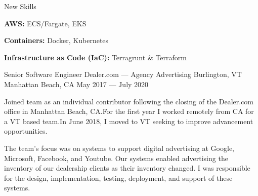 \vspace{-2.00mm}
\begin{cventries}
\cventry
    {New Skills} %
    {} %
    {} %
    {} %
    {    
      \begin{cvitems} %
        \item {\textbf{AWS:} ECS/Fargate, EKS}
        \item {\textbf{Containers:} Docker, Kubernetes}
        \item {\textbf{Infrastructure as Code (IaC):} Terragrunt \& Terraform}
      \end{cvitems}
    }

  \cventry
    {Senior Software Engineer} %
    {Dealer.com --- Agency Advertising} %
    {Burlington, VT \linebreak Manhattan Beach, CA} %
    {May 2017 --- July 2020} %
    {}
\end{cventries}

\vspace{-4.00mm}
\begin{cvparagraph}
Joined team as an individual contributor following the closing of the
Dealer.com office in Manhattan Beach, CA.\@ For the first year I worked
remotely from CA for a VT based team.\@ In June 2018, I moved to VT
seeking to improve advancement opportunities.
\end{cvparagraph}

\vspace{-1.00mm}

\begin{cvparagraph}
The team's focus was on systems to support digital advertising at Google, Microsoft, Facebook, and Youtube.\@
Our systems enabled advertising the inventory of our dealership clients as their inventory changed.\@
I was responsible for the design, implementation, testing, deployment, and support of these systems.
\end{cvparagraph}

